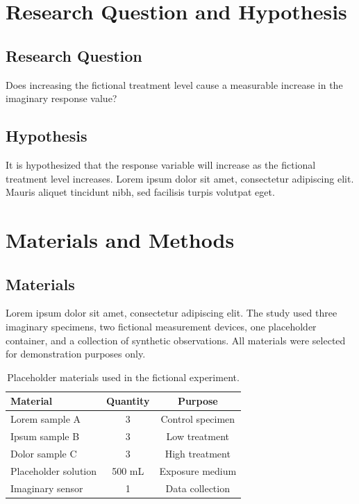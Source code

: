 \documentclass[11pt]{article}
\begin{document}
\section{Research Question and Hypothesis}

\subsection{Research Question}

Does increasing the fictional treatment level cause a measurable
increase in the imaginary response value?

\subsection{Hypothesis}

It is hypothesized that the response variable will increase as the
fictional treatment level increases. Lorem ipsum dolor sit amet,
consectetur adipiscing elit. Mauris aliquet tincidunt nibh, sed
facilisis turpis volutpat eget.

\section{Materials and Methods}

\subsection{Materials}

Lorem ipsum dolor sit amet, consectetur adipiscing elit. The study used
three imaginary specimens, two fictional measurement devices, one
placeholder container, and a collection of synthetic observations.
All materials were selected for demonstration purposes only.

\begin{table}[H]
\centering
\caption{Placeholder materials used in the fictional experiment.}
\label{tab:materials}
\begin{tabular}{lcc}
\toprule
\textbf{Material} & \textbf{Quantity} & \textbf{Purpose} \\
\midrule
Lorem sample A & 3 & Control specimen \\
Ipsum sample B & 3 & Low treatment \\
Dolor sample C & 3 & High treatment \\
Placeholder solution & 500 mL & Exposure medium \\
Imaginary sensor & 1 & Data collection \\
\bottomrule
\end{tabular}
\end{table}
\end{document}
